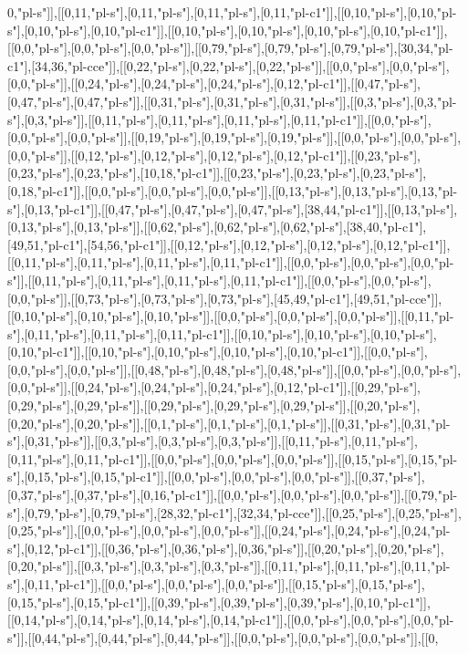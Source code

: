 0,"pl-s"]],[[0,11,"pl-s"],[0,11,"pl-s"],[0,11,"pl-s"],[0,11,"pl-c1"]],[[0,10,"pl-s"],[0,10,"pl-s"],[0,10,"pl-s"],[0,10,"pl-c1"]],[[0,10,"pl-s"],[0,10,"pl-s"],[0,10,"pl-s"],[0,10,"pl-c1"]],[[0,0,"pl-s"],[0,0,"pl-s"],[0,0,"pl-s"]],[[0,79,"pl-s"],[0,79,"pl-s"],[0,79,"pl-s"],[30,34,"pl-c1"],[34,36,"pl-cce"]],[[0,22,"pl-s"],[0,22,"pl-s"],[0,22,"pl-s"]],[[0,0,"pl-s"],[0,0,"pl-s"],[0,0,"pl-s"]],[[0,24,"pl-s"],[0,24,"pl-s"],[0,24,"pl-s"],[0,12,"pl-c1"]],[[0,47,"pl-s"],[0,47,"pl-s"],[0,47,"pl-s"]],[[0,31,"pl-s"],[0,31,"pl-s"],[0,31,"pl-s"]],[[0,3,"pl-s"],[0,3,"pl-s"],[0,3,"pl-s"]],[[0,11,"pl-s"],[0,11,"pl-s"],[0,11,"pl-s"],[0,11,"pl-c1"]],[[0,0,"pl-s"],[0,0,"pl-s"],[0,0,"pl-s"]],[[0,19,"pl-s"],[0,19,"pl-s"],[0,19,"pl-s"]],[[0,0,"pl-s"],[0,0,"pl-s"],[0,0,"pl-s"]],[[0,12,"pl-s"],[0,12,"pl-s"],[0,12,"pl-s"],[0,12,"pl-c1"]],[[0,23,"pl-s"],[0,23,"pl-s"],[0,23,"pl-s"],[10,18,"pl-c1"]],[[0,23,"pl-s"],[0,23,"pl-s"],[0,23,"pl-s"],[0,18,"pl-c1"]],[[0,0,"pl-s"],[0,0,"pl-s"],[0,0,"pl-s"]],[[0,13,"pl-s"],[0,13,"pl-s"],[0,13,"pl-s"],[0,13,"pl-c1"]],[[0,47,"pl-s"],[0,47,"pl-s"],[0,47,"pl-s"],[38,44,"pl-c1"]],[[0,13,"pl-s"],[0,13,"pl-s"],[0,13,"pl-s"]],[[0,62,"pl-s"],[0,62,"pl-s"],[0,62,"pl-s"],[38,40,"pl-c1"],[49,51,"pl-c1"],[54,56,"pl-c1"]],[[0,12,"pl-s"],[0,12,"pl-s"],[0,12,"pl-s"],[0,12,"pl-c1"]],[[0,11,"pl-s"],[0,11,"pl-s"],[0,11,"pl-s"],[0,11,"pl-c1"]],[[0,0,"pl-s"],[0,0,"pl-s"],[0,0,"pl-s"]],[[0,11,"pl-s"],[0,11,"pl-s"],[0,11,"pl-s"],[0,11,"pl-c1"]],[[0,0,"pl-s"],[0,0,"pl-s"],[0,0,"pl-s"]],[[0,73,"pl-s"],[0,73,"pl-s"],[0,73,"pl-s"],[45,49,"pl-c1"],[49,51,"pl-cce"]],[[0,10,"pl-s"],[0,10,"pl-s"],[0,10,"pl-s"]],[[0,0,"pl-s"],[0,0,"pl-s"],[0,0,"pl-s"]],[[0,11,"pl-s"],[0,11,"pl-s"],[0,11,"pl-s"],[0,11,"pl-c1"]],[[0,10,"pl-s"],[0,10,"pl-s"],[0,10,"pl-s"],[0,10,"pl-c1"]],[[0,10,"pl-s"],[0,10,"pl-s"],[0,10,"pl-s"],[0,10,"pl-c1"]],[[0,0,"pl-s"],[0,0,"pl-s"],[0,0,"pl-s"]],[[0,48,"pl-s"],[0,48,"pl-s"],[0,48,"pl-s"]],[[0,0,"pl-s"],[0,0,"pl-s"],[0,0,"pl-s"]],[[0,24,"pl-s"],[0,24,"pl-s"],[0,24,"pl-s"],[0,12,"pl-c1"]],[[0,29,"pl-s"],[0,29,"pl-s"],[0,29,"pl-s"]],[[0,29,"pl-s"],[0,29,"pl-s"],[0,29,"pl-s"]],[[0,20,"pl-s"],[0,20,"pl-s"],[0,20,"pl-s"]],[[0,1,"pl-s"],[0,1,"pl-s"],[0,1,"pl-s"]],[[0,31,"pl-s"],[0,31,"pl-s"],[0,31,"pl-s"]],[[0,3,"pl-s"],[0,3,"pl-s"],[0,3,"pl-s"]],[[0,11,"pl-s"],[0,11,"pl-s"],[0,11,"pl-s"],[0,11,"pl-c1"]],[[0,0,"pl-s"],[0,0,"pl-s"],[0,0,"pl-s"]],[[0,15,"pl-s"],[0,15,"pl-s"],[0,15,"pl-s"],[0,15,"pl-c1"]],[[0,0,"pl-s"],[0,0,"pl-s"],[0,0,"pl-s"]],[[0,37,"pl-s"],[0,37,"pl-s"],[0,37,"pl-s"],[0,16,"pl-c1"]],[[0,0,"pl-s"],[0,0,"pl-s"],[0,0,"pl-s"]],[[0,79,"pl-s"],[0,79,"pl-s"],[0,79,"pl-s"],[28,32,"pl-c1"],[32,34,"pl-cce"]],[[0,25,"pl-s"],[0,25,"pl-s"],[0,25,"pl-s"]],[[0,0,"pl-s"],[0,0,"pl-s"],[0,0,"pl-s"]],[[0,24,"pl-s"],[0,24,"pl-s"],[0,24,"pl-s"],[0,12,"pl-c1"]],[[0,36,"pl-s"],[0,36,"pl-s"],[0,36,"pl-s"]],[[0,20,"pl-s"],[0,20,"pl-s"],[0,20,"pl-s"]],[[0,3,"pl-s"],[0,3,"pl-s"],[0,3,"pl-s"]],[[0,11,"pl-s"],[0,11,"pl-s"],[0,11,"pl-s"],[0,11,"pl-c1"]],[[0,0,"pl-s"],[0,0,"pl-s"],[0,0,"pl-s"]],[[0,15,"pl-s"],[0,15,"pl-s"],[0,15,"pl-s"],[0,15,"pl-c1"]],[[0,39,"pl-s"],[0,39,"pl-s"],[0,39,"pl-s"],[0,10,"pl-c1"]],[[0,14,"pl-s"],[0,14,"pl-s"],[0,14,"pl-s"],[0,14,"pl-c1"]],[[0,0,"pl-s"],[0,0,"pl-s"],[0,0,"pl-s"]],[[0,44,"pl-s"],[0,44,"pl-s"],[0,44,"pl-s"]],[[0,0,"pl-s"],[0,0,"pl-s"],[0,0,"pl-s"]],[[0,